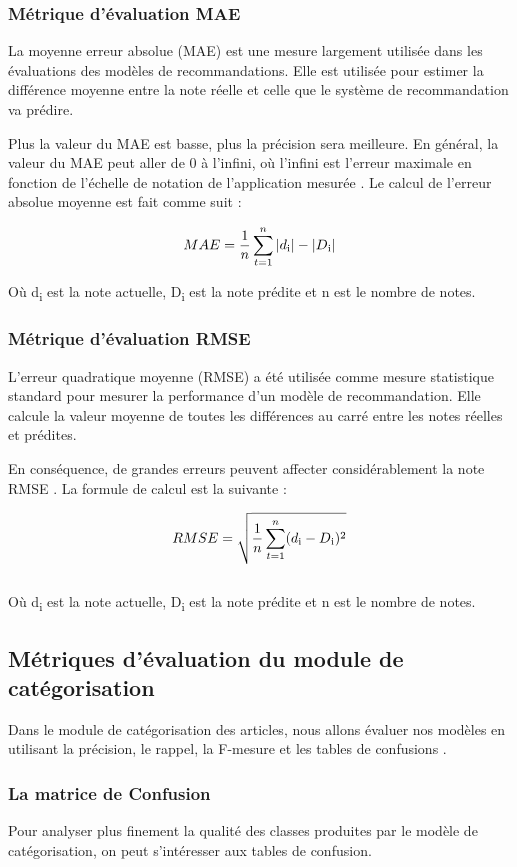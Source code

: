         \subsubsection{Métrique d'évaluation MAE}
        La moyenne erreur absolue (MAE) est une mesure largement utilisée dans les évaluations des modèles de recommandations. Elle est utilisée pour estimer la différence moyenne entre la note réelle et celle que le système de recommandation va prédire. 

        Plus la valeur du MAE est basse, plus la précision sera meilleure. En général, la valeur du MAE peut aller de 0 à l'infini, où l'infini est l'erreur maximale en fonction de l'échelle de notation de l'application mesurée \cite{rmse}. Le calcul de l'erreur absolue moyenne est fait comme suit :

        \[MAE = \frac{1}{n}\sum_{t=1}^{n}|d\textsubscript{i}|-|D\textsubscript{i}|\]

        Où d\textsubscript{i} est la note actuelle, D\textsubscript{i} est la note prédite et n est le nombre de notes.

        \subsubsection{Métrique d'évaluation RMSE}
        L'erreur quadratique moyenne (RMSE) a été utilisée comme mesure statistique standard pour mesurer la performance d'un modèle de recommandation. Elle  calcule la valeur moyenne de toutes les différences au carré entre les notes réelles et prédites. 

        En conséquence, de grandes erreurs peuvent affecter considérablement la note RMSE \cite{rmse}. La formule de calcul est la suivante :

        \[RMSE = \sqrt{\frac{1}{n}\sum_{t=1}^{n}(d\textsubscript{i} - D\textsubscript{i})^2}\] \\

        Où d\textsubscript{i} est la note actuelle, D\textsubscript{i} est la note prédite et n est le nombre de notes.

    \subsection{Métriques d'évaluation du module de catégorisation}
    Dans le module de catégorisation des articles, nous allons évaluer nos modèles en utilisant la précision, le rappel, la F-mesure et les tables de confusions \cite{mesurecateg}.
        \subsubsection{La matrice de Confusion}
        Pour analyser plus finement la qualité des classes produites par le modèle de catégorisation, on peut s’intéresser aux tables de confusion.


